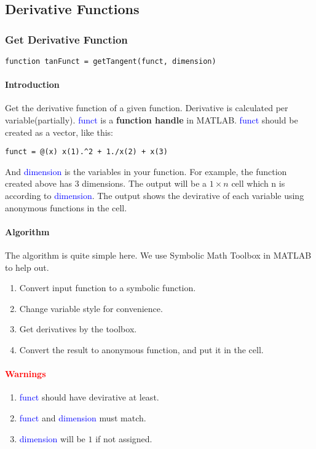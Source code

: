 \documentclass{article}
\begin{document}
\subsection{Derivative Functions}
\subsubsection{Get Derivative Function}
\begin{verbatim}
function tanFunct = getTangent(funct, dimension)
\end{verbatim}

\paragraph{Introduction}
Get the derivative function of a given function. Derivative is calculated per variable(partially). \textcolor{blue}{funct} is a \textbf{function handle} in MATLAB. \textcolor{blue}{funct} should be created as a vector, like this:
\begin{verbatim}
funct = @(x) x(1).^2 + 1./x(2) + x(3)   
\end{verbatim}

And \textcolor{blue}{dimension} is the variables in your function. For example, the function created above has $3$ dimensions. The output will be a $1 \times n$ cell which n is according to \textcolor{blue}{dimension}. The output shows the devirative of each variable using anonymous functions in the cell.

\paragraph{Algorithm}
The algorithm is quite simple here. We use Symbolic Math Toolbox in MATLAB to help out. 
\begin{enumerate}
    \item Convert input function to a symbolic function.
    \item Change variable style for convenience.
    \item Get derivatives by the toolbox.
    \item Convert the result to anonymous function, and put it in the cell.
\end{enumerate}

\paragraph{\textcolor{red}{Warnings}}
\begin{enumerate}
    \item \textcolor{blue}{funct} should have devirative at least.
    \item \textcolor{blue}{funct} and \textcolor{blue}{dimension} must match.
    \item \textcolor{blue}{dimension} will be $1$ if not assigned.
\end{enumerate}
\end{document}
